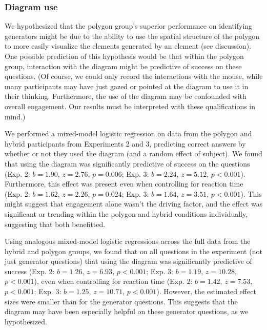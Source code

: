 \documentclass[man,10pt]{apa6}
\begin{document}
\subsubsection{Diagram use}
We hypothesized that the polygon group's superior performance on identifying generators might be due to the ability to use the spatial structure of the polygon to more easily visualize the elements generated by an element (see discussion). One possible prediction of this hypothesis would be that within the polygon group, interaction with the diagram might be predictive of success on these questions. (Of course, we could only record the interactions with the mouse, while many participants may have just gazed or pointed at the diagram to use it in their thinking. Furthermore, the use of the diagram may be confounded with overall engagement. Our results must be interpreted with these qualifications in mind.) \par
We performed a mixed-model logistic regression on data from the polygon and hybrid participants from Experiments 2 and 3, predicting correct answers by whether or not they used the diagram (and a random effect of subject). We found that using the diagram was significantly predictive of success on the questions (Exp. 2: $b=1.90$, $z = 2.76$, $p = 0.006$; Exp. 3: $b=2.24$, $z = 5.12$, $p < 0.001$). Furthermore, this effect was present even when controlling for reaction time (Exp. 2: $b = 1.62$, $z = 2.26$, $p = 0.024$; Exp. 3: $b = 1.64$, $z = 3.51$, $p < 0.001$). This might suggest that engagement alone wasn't the driving factor, and the effect was significant or trending within the polygon and hybrid conditions individually, suggesting that both benefitted. \par
Using analogous mixed-model logistic regressions across the full data from the hybrid and polygon groups, we found that on all questions in the experiment (not just generator questions) that using the diagram was significantly predictive of success (Exp. 2: $b = 1.26$, $z = 6.93$, $p < 0.001$; Exp. 3: $b = 1.19$, $z= 10.28$, $p < 0.001$), even when controlling for reaction time (Exp. 2: $b = 1.42$, $z = 7.53$, $p < 0.001$; Exp. 3: $b = 1.25$, $z = 10.71$, $p < 0.001$). However, the estimated effect sizes were smaller than for the generator questions. This suggests that the diagram may have been especially helpful on these generator questions, as we hypothesized. \\
\end{document}

